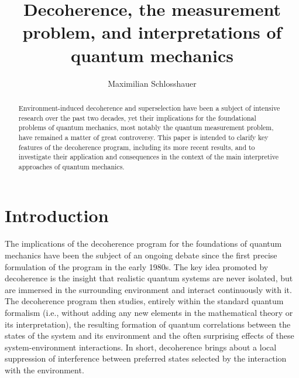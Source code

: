 \documentclass[rmp,aps,amsmath,amsfonts,noshowkeys,noshowpacs,12pt]{revtex4}
\begin{document}
\makeatletter
{}
\renewcommand{\theequation}{\@arabic\c@section.\@arabic\c@equation}
\makeatother

\title{Decoherence, the measurement problem, and interpretations of
  quantum mechanics}

\author{Maximilian Schlosshauer} 




\begin{abstract}
  Environment-induced decoherence and superselection have been a
  subject of intensive research over the past two decades, yet their
  implications for the foundational problems of quantum mechanics,
  most notably the quantum measurement problem, have remained a matter
  of great controversy. This paper is intended to clarify key features
  of the decoherence program, including its more recent results, and
  to investigate their application and consequences in the context of
  the main interpretive approaches of quantum mechanics.
\end{abstract}



\maketitle

\tableofcontents 

\newpage

\section{Introduction}

The implications of the decoherence program for the foundations of
quantum mechanics have been the subject of an ongoing debate since the
first precise formulation of the program in the early 1980s. The key
idea promoted by decoherence is the insight that realistic quantum
systems are never isolated, but are immersed in the surrounding
environment and interact continuously with it.  The decoherence
program then studies, entirely within the standard quantum formalism
(i.e., without adding any new elements in the mathematical theory or
its interpretation), the resulting formation of quantum correlations
between the states of the system and its environment and the often
surprising effects of these system-environment interactions. In short,
decoherence brings about a local suppression of interference between
preferred states selected by the interaction with the environment.
\end{document}

